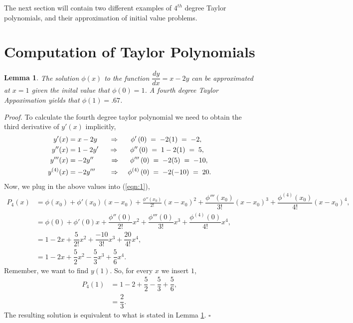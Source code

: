 \documentclass[12pt, letterpaper]{article}  %
\newtheorem{lem}[thrm]{Lemma}
\begin{document}
The next section will contain two different examples of $4^{th}$ degree Taylor polynomials, and their approximation of initial value problems. 

\section{Computation of Taylor Polynomials}
\begin{lem}\label{Le_1}
  The solution $\phi(x)$ to the function $\dfrac{dy}{dx} = x - 2y$ can be approximated at $x = 1$ 
  given the inital value that $\phi\left(0\right) = 1$. A fourth degree Taylor Appoximation yields
  that $\phi\left(1\right) = .67$. \\
\end{lem}
\textit{Proof.} To calculate the fourth degree taylor polynomial we need to obtain the
third derivative of $y'(x)$ implicitly,   
\begin{align*}
  y'(x) &= x - 2y \hspace{.6cm} \Rightarrow \hspace{.55cm} \phi'\left(0\right)\; =\; -2(1)\; =\; -2,\\
  y''(x) &= 1 - 2y' \hspace{.5cm} \Rightarrow \hspace{.55cm} \phi''\left(0\right)\; =\; 1 - 2(1)\; =\; 5,\\
  y'''(x) &= -2y'' \hspace{.8cm} \Rightarrow \hspace{.5cm} \phi'''\left(0\right)\; =\; -2(5)\; =\; -10,\\
  y^{(4)}(x) &= -2y''' \hspace{.7cm} \Rightarrow \hspace{.4cm} \phi^{(4)}\left(0\right)\; =\; -2(-10)\; =\; 20. 
\end{align*}
Now, we plug in the above values into (\ref{eqn:1}),
\begin{align*}
  P_4(x) &= \phi(x_0) + \phi'(x_0)(x-x_0) + \frac{\phi''(x_0)}{2!}(x-x_0)^2 + \dfrac{\phi'''(x_0)}{3!}(x-x_0)^3 
  + \dfrac{\phi^{(4)}(x_0)}{4!}(x-x_0)^4, \\
  &= \phi(0) + \phi'(0)x + \dfrac{\phi''(0)}{2!}x^2 + \dfrac{\phi'''(0)}{3!}x^3 + \dfrac{\phi^{(4)}(0)}{4!}
  x^4, \\
  &= 1 - 2x + \dfrac{5}{2!}x^2 + \dfrac{-10}{3!}x^3 + \dfrac{20}{4!}x^4, \\
  &= 1 - 2x + \dfrac{5}{2}x^2 - \dfrac{5}{3}x^3 + \dfrac{5}{6}x^4. 
\end{align*}
Remember, we want to  find $y(1)$.  So, for every $x$ we insert $1$,
\begin{align*}
  P_4(1) &= 1 - 2 + \dfrac{5}{2} - \dfrac{5}{3} + \dfrac{5}{6}, \\
         &= \dfrac{2}{3}.
\end{align*}
The resulting solution is equivalent to what is stated in Lemma \ref{Le_1}. $\square$  
\end{document}
